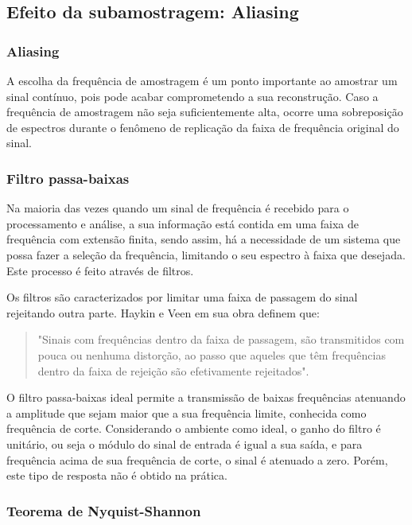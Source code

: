 \documentclass[]{IEEEtran}
\begin{document}
\subsection{Efeito da subamostragem: Aliasing}

\subsubsection{Aliasing}

A escolha da frequência de amostragem é um ponto importante ao amostrar um sinal contínuo, pois pode acabar comprometendo a sua reconstrução. Caso a frequência de amostragem não seja suficientemente alta, ocorre uma sobreposição de espectros durante o fenômeno de replicação da faixa de frequência original do sinal.

\subsubsection{Filtro passa-baixas}

Na maioria das vezes quando um sinal de frequência é recebido para o processamento e análise, a sua informação está contida em uma faixa de frequência com extensão finita, sendo assim, há a necessidade de um sistema que possa fazer a seleção da frequência, limitando o seu espectro à faixa que desejada. Este processo é feito através de filtros.

Os filtros são caracterizados por limitar uma faixa de passagem do sinal rejeitando outra parte. Haykin e Veen em sua obra definem que:

\begin{quote}
    "Sinais com frequências dentro da faixa de passagem, são transmitidos com pouca ou nenhuma distorção, ao passo que aqueles que têm frequências dentro da faixa de rejeição são efetivamente rejeitados".
\end{quote}

O filtro passa-baixas ideal permite a transmissão de baixas frequências atenuando a amplitude que sejam maior que a sua frequência limite, conhecida como frequência de corte. Considerando o ambiente como ideal, o ganho do filtro é unitário, ou seja o módulo do sinal de entrada é igual a sua saída, e para frequência acima de sua frequência de corte, o sinal é atenuado a zero. Porém, este tipo de resposta não é obtido na prática.

\subsubsection{Teorema de Nyquist-Shannon}
\end{document}
